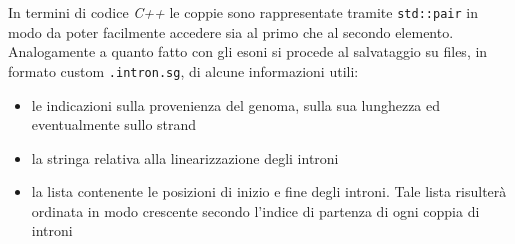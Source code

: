 \documentclass[a4paper,12pt, oneside]{book}
\begin{document}
In termini di codice \textit{C++} le coppie sono rappresentate tramite
\texttt{std::pair} in modo da poter facilmente accedere sia al primo che al
secondo elemento.\\
Analogamente a quanto fatto con gli esoni si procede al salvataggio su files, in
formato custom \texttt{.intron.sg}, di alcune informazioni utili:
\begin{itemize}
  \item le indicazioni sulla provenienza del genoma, sulla sua lunghezza ed
  eventualmente sullo strand 
  \item la stringa relativa alla linearizzazione degli introni
  \item la lista contenente le posizioni di inizio e fine degli introni. Tale
  lista risulterà ordinata in modo crescente secondo l'indice di partenza di
  ogni coppia di introni
\end{itemize}
\end{document}
